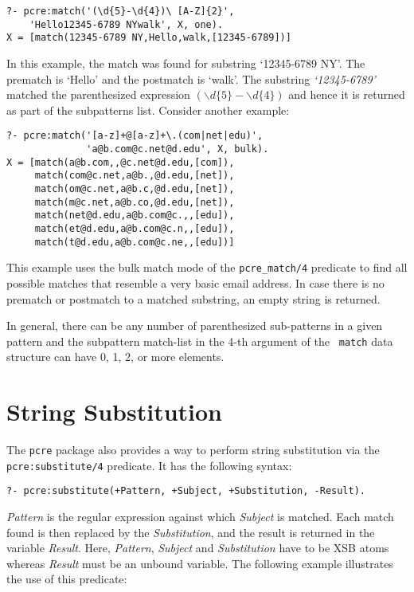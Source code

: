 \begin{verbatim}
?- pcre:match('(\d{5}-\d{4})\ [A-Z]{2}',
	'Hello12345-6789 NYwalk', X, one).
X = [match(12345-6789 NY,Hello,walk,[12345-6789])]
\end{verbatim}

In this example, the match was found for substring `12345-6789 NY'. The
prematch is `Hello' and the postmatch is `walk'. The substring
\textit{`12345-6789'} matched the parenthesized expression $ ( \backslash d
\lbrace 5 \rbrace - \backslash d \lbrace 4 \rbrace ) $ and hence it is
returned as part of the subpatterns list. Consider another example:

\begin{verbatim}
?- pcre:match('[a-z]+@[a-z]+\.(com|net|edu)', 
              'a@b.com@c.net@d.edu', X, bulk).
X = [match(a@b.com,,@c.net@d.edu,[com]),
     match(com@c.net,a@b.,@d.edu,[net]),
     match(om@c.net,a@b.c,@d.edu,[net]),
     match(m@c.net,a@b.co,@d.edu,[net]),
     match(net@d.edu,a@b.com@c.,,[edu]),
     match(et@d.edu,a@b.com@c.n,,[edu]),
     match(t@d.edu,a@b.com@c.ne,,[edu])]
\end{verbatim}

This example uses the bulk match mode of the {\tt pcre\_match/4}
predicate to find
all possible matches that resemble a very basic email address. In case
there is no prematch or postmatch to a matched substring, an empty string
is returned.

In general, there can be any number of parenthesized sub-patterns in a given
pattern and the subpattern match-list in the 4-th argument of the {\tt
  match} data structure can have 0, 1, 2, or more elements. 


\section{String Substitution}


The {\tt pcre} package also provides a way to perform string substitution
via the {\tt pcre:substitute/4}  predicate. It has the following syntax:

\begin{verbatim}
?- pcre:substitute(+Pattern, +Subject, +Substitution, -Result).
\end{verbatim}

\textit{Pattern} is the regular expression against which \textit{Subject}
is matched. Each match found is then replaced by the \textit{Substitution},
and the result is returned in the variable \textit{Result}. Here,
\textit{Pattern}, \textit{Subject} and \textit{Substitution} have to be XSB
atoms whereas \textit{Result} must be an unbound variable. The following
example illustrates the use of this predicate:


